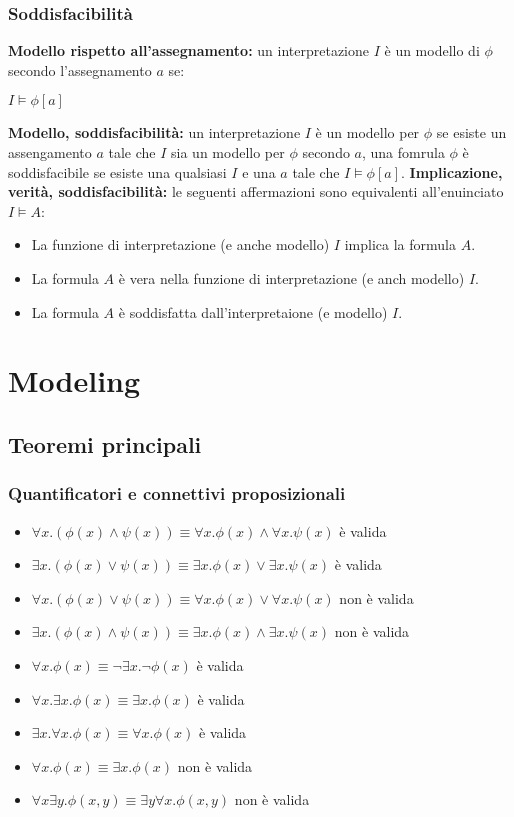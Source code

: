 \documentclass[../main.tex]{subfiles}
\begin{document}
   \subsection{Soddisfacibilità}
   \textbf{Modello rispetto all'assegnamento:} un interpretazione $I$ è un modello di $\phi$ secondo l'assegnamento $a$ se:
   \begin{center}
      $I \models \phi [a]$
   \end{center}
   \textbf{Modello, soddisfacibilità:} un interpretazione $I$ è un modello per $\phi$ se esiste un assengamento $a$ tale che $I$ sia un modello per $\phi$ secondo $a$, una fomrula $\phi$ è soddisfacibile se esiste una qualsiasi $I$ e una $a$ tale che $I \models \phi [a]$.
   \spazio
   \textbf{Implicazione, verità, soddisfacibilità:} le seguenti affermazioni sono equivalenti all'enuinciato $I \models A$:
   \begin{itemize}
      \item La funzione di interpretazione (e anche modello) $I$ implica la formula $A$.
      \item La formula $A$ è vera nella funzione di interpretazione (e anch modello) $I$.
      \item La formula $A$ è soddisfatta dall'interpretaione (e modello) $I$.
   \end{itemize}

   \chapter{Modeling}
   \section{Teoremi principali}
   \subsection{Quantificatori e connettivi proposizionali}
   \begin{itemize}
      \item $\forall x.(\phi (x) \land \psi (x)) \equiv \forall x .\phi (x) \land \forall x. \psi (x)$ è valida
      \item $\exists x.(\phi (x) \lor \psi (x)) \equiv \exists x. \phi (x) \lor \exists x. \psi (x)$ è valida
      \item $\forall x.(\phi (x) \lor \psi (x)) \equiv \forall x. \phi (x) \lor \forall x. \psi (x)$ non è valida 
      \item $\exists x.(\phi (x) \land \psi (x)) \equiv \exists x.\phi (x) \land \exists x. \psi (x)$ non è valida
      \item $\forall x.\phi(x) \equiv \lnot \exists x.\lnot \phi(x)$ è valida
      \item $\forall x.\exists x.\phi(x) \equiv \exists x.\phi(x)$ è valida
      \item $\exists x.\forall x.\phi(x) \equiv \forall x.\phi(x)$ è valida
      \item $\forall x.\phi(x) \equiv \exists x.\phi(x)$ non è valida 
      \item $\forall x\exists y.\phi(x, y) \equiv \exists y\forall x.\phi(x, y)$ non è valida 
   \end{itemize}
\end{document}
